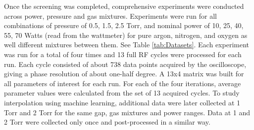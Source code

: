 \documentclass[12pt]{iopart}
\begin{document}
 Once the screening was completed, comprehensive experiments were conducted across power, pressure and gas mixtures. Experiments were run for all combinations of pressure of 0.5, 1.5, 2.5 Torr, and nominal power of 10, 25, 40, 55, 70 Watts (read from the wattmeter) for pure argon, nitrogen, and oxygen as well different mixtures between them. See Table \ref{tab:Datasets}. Each experiment was run for a total of four times and 13 full RF cycles were processed for each run. Each cycle consisted of about 738 data points acquired by the oscilloscope, giving a phase resolution of about one-half degree. A 13x4 matrix was built for all parameters of interest for each run. For each of the four iterations, average parameter values were calculated from the set of 13 acquired cycles. To study interpolation using machine learning, additional data were later collected at 1 Torr and 2 Torr for the same gap, gas mixtures and power ranges. Data at 1 and 2 Torr were collected only once and post-processed in a similar way.
\end{document}
